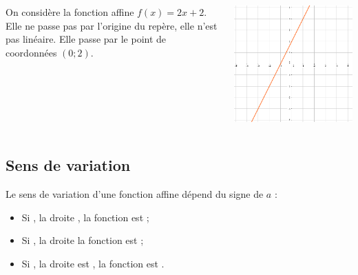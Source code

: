 \documentclass[xcolor={dvipsnames}]{beamer}
\begin{document}
\begin{frame}
\begin{myex}
		\begin{columns}[c]
			\begin{column}{6cm}
				On considère la fonction affine $f(x)=2x+2$. Elle ne passe pas par l'origine du repère, elle n'est pas linéaire. Elle passe par le point de coordonnées $(0;2)$.
			\end{column}
			
			\begin{column}{6cm}
				\includegraphics[scale=0.5]{ex1}
			\end{column}			
			
		\end{columns}
	\end{myex}
\end{frame}

\subsection{Sens de variation}

\begin{frame}

\begin{myprop}
	Le sens de variation d'une fonction affine dépend du signe de $a$ :
	\begin{itemize}
		\item Si , la droite , la fonction est ;
		\item Si , la droite  la fonction est ;
		\item Si , la droite est , la fonction est .
	\end{itemize}
\end{myprop}

\end{frame}
\end{document}
